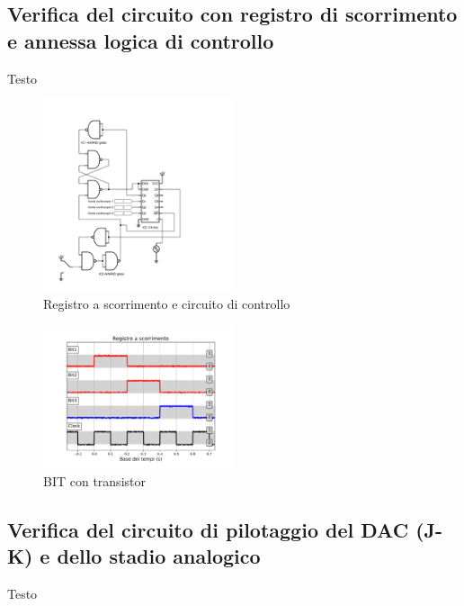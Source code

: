 \documentclass[journal]{IEEEtran}
\begin{document}
\subsection{Verifica del circuito con registro di scorrimento e annessa logica di controllo}
Testo


\begin{figure}[H]%
\begin{center}
\includegraphics[width=0.50\textwidth]{sch-simulations/digital/output/shift-register.pdf}
\caption{Registro a scorrimento e circuito di controllo}
\label{fig:circuit_shift_register}
\end{center}
\end{figure}

\begin{figure}[H]%
\begin{center}
\includegraphics[trim = {0 0 0 0}, clip, width=0.50\textwidth]{analysis/output/reg_test.pdf}
\caption{BIT con transistor}
\label{fig:BIT_with_transistor}
\end{center}
\end{figure}



\subsection{Verifica del circuito di pilotaggio del DAC (J-K) e dello stadio analogico}
Testo
\end{document}

